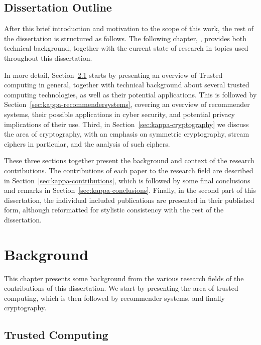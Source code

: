 \section{Dissertation Outline}

After this brief introduction and motivation to the scope of this work, the rest of the dissertation is structured as follows.
The following chapter, , provides both technical background, together with the current state of research in topics used throughout this dissertation.

In more detail, Section~\ref{sec:kappa-trustedcomputing} starts by presenting an overview of Trusted computing in general, together with technical background about several trusted computing technologies, as well as their potential applications.
This is followed by Section~\ref{sec:kappa-recommendersystems}, covering an overview of recommender systems, their possible applications in cyber security, and potential privacy implications of their use.
Third, in Section~\ref{sec:kappa-cryptography} we discuss the area of cryptography, with an emphasis on symmetric cryptography, stream ciphers in particular, and the analysis of such ciphers.

These three sections together present the background and context of the research contributions.
The contributions of each paper to the research field are described in Section~\ref{sec:kappa-contributions}, which is followed by some final conclusions and remarks in Section~\ref{sec:kappa-conclusions}.
Finally, in the second part of this dissertation, the individual included publications are presented in their published form, although reformatted for stylistic consistency with the rest of the dissertation.

\chapter{Background}
\label{ch:kappa-background}

This chapter presents some background from the various research fields of the contributions of this dissertation.
We start by presenting the area of trusted computing, which is then followed by recommender systems, and finally cryptography.

\section{Trusted Computing}
\label{sec:kappa-trustedcomputing}

